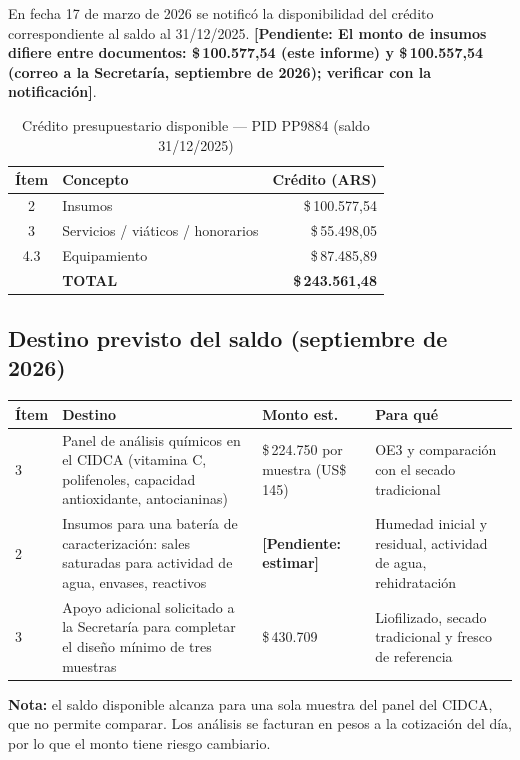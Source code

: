 \documentclass[12pt, a4paper]{article}
\newcommand{\porconf}[1]{\textcolor{orange!85!black}{#1}}
\newcommand{\pend}[1]{\textcolor{red!70!black}{\textbf{[Pendiente: #1]}}}
\begin{document}
En fecha 17 de marzo de 2026 se notificó la disponibilidad del crédito correspondiente al saldo al 31/12/2025. \pend{El monto de insumos difiere entre documentos: \$\,100.577,54 (este informe) y \$\,100.557,54 (correo a la Secretaría, septiembre de 2026); verificar con la notificación}.

\begin{table}[H]
\centering
\caption{Crédito presupuestario disponible --- PID PP9884 (saldo 31/12/2025)}
\label{tab:credito}
\begin{tabular}{clr}
\toprule
\textbf{Ítem} & \textbf{Concepto} & \textbf{Crédito (ARS)} \\
\midrule
2 & Insumos & \porconf{\$\,100.577{,}54} \\
3 & Servicios / viáticos / honorarios & \$\,55.498{,}05 \\
4.3 & Equipamiento & \$\,87.485{,}89 \\
\midrule
& \textbf{TOTAL} & \textbf{\porconf{\$\,243.561{,}48}} \\
\bottomrule
\end{tabular}
\end{table}

\subsection{Destino previsto del saldo (septiembre de 2026)}

\begin{longtable}{p{1cm}p{5.8cm}p{2.5cm}p{4.3cm}}
\toprule
\textbf{Ítem} & \textbf{Destino} & \textbf{Monto est.} & \textbf{Para qué} \\
\midrule
3 & Panel de análisis químicos en el CIDCA (vitamina C, polifenoles, capacidad antioxidante, antocianinas) & \$\,224.750 por muestra (US\$\,145) & OE3 y comparación con el secado tradicional \\
2 & Insumos para una batería de caracterización: sales saturadas para actividad de agua, envases, reactivos & \pend{estimar} & Humedad inicial y residual, actividad de agua, rehidratación \\
3 & Apoyo adicional solicitado a la Secretaría para completar el diseño mínimo de tres muestras & \porconf{\$\,430.709} & Liofilizado, secado tradicional y fresco de referencia \\
\bottomrule
\end{longtable}

\textbf{Nota:} el saldo disponible alcanza para una sola muestra del panel del CIDCA, que no permite comparar. Los análisis se facturan en pesos a la cotización del día, por lo que el monto tiene riesgo cambiario.
\end{document}

